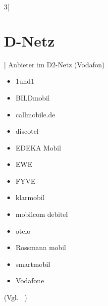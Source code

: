 \begin{multicols}{3}[\section {D-Netz}]
Anbieter im D2-Netz (Vodafon)

\begin{itemize}
\item 1und1
\item BILDmobil
\item callmobile.de
\item discotel
\item EDEKA Mobil
\item EWE
\item FYVE
\item klarmobil
\item mobilcom debitel
\item otelo
\item Rossmann mobil
\item smartmobil
\item Vodafone
\end{itemize}
(Vgl. ~\cite{vorlage.1})



\end{multicols}
\newpage
